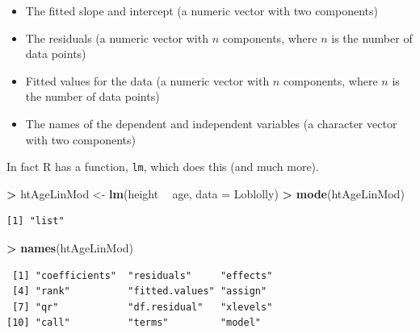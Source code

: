 \documentclass[]{krantz}
\makeatletter
\newenvironment{Shaded}{\begin{snugshade}}{\end{snugshade}}
\newcommand{\KeywordTok}[1]{\textcolor[rgb]{0.27,0.27,0.27}{\textbf{#1}}}
\newcommand{\DataTypeTok}[1]{\textcolor[rgb]{0.27,0.27,0.27}{#1}}
\newcommand{\StringTok}[1]{\textcolor[rgb]{0.5,0.5,0.5}{#1}}
\newcommand{\OperatorTok}[1]{\textcolor[rgb]{0.43,0.43,0.43}{\textbf{#1}}}
\newcommand{\NormalTok}[1]{#1}
\providecommand{\tightlist}{%
  \setlength{\itemsep}{0pt}\setlength{\parskip}{0pt}}
\newenvironment{kframe}{%
\medskip{}
\setlength{\fboxsep}{.8em}
 \def\at@end@of@kframe{}%
 \ifinner\ifhmode%
  \def\at@end@of@kframe{\end{minipage}}%
  \begin{minipage}{\columnwidth}%
 \fi\fi%
 \def\FrameCommand##1{\hskip\@totalleftmargin \hskip-\fboxsep
 \colorbox{shadecolor}{##1}\hskip-\fboxsep
     \hskip-\linewidth \hskip-\@totalleftmargin \hskip\columnwidth}%
 \MakeFramed {\advance\hsize-\width
   \@totalleftmargin\z@ \linewidth\hsize
   \@setminipage}}%
 {\par\unskip\endMakeFramed%
 \at@end@of@kframe}
\renewenvironment{Shaded}{\begin{kframe}}{\end{kframe}}
\theoremstyle{definition}
\theoremstyle{definition}
\theoremstyle{definition}
\theoremstyle{remark}
\makeatother
\begin{document}
\begin{itemize}
\tightlist
\item
  The fitted slope and intercept (a numeric vector with two components)
\item
  The residuals (a numeric vector with \(n\) components, where \(n\) is
  the number of data points)
\item
  Fitted values for the data (a numeric vector with \(n\) components,
  where \(n\) is the number of data points)
\item
  The names of the dependent and independent variables (a character
  vector with two components)
\end{itemize}

In fact R has a function, \texttt{lm}, which does this (and much more).

\begin{Shaded}
\begin{Highlighting}[]
\OperatorTok{>}\StringTok{ }\NormalTok{htAgeLinMod <-}\StringTok{ }\KeywordTok{lm}\NormalTok{(height }\OperatorTok{~}\StringTok{ }\NormalTok{age, }\DataTypeTok{data =}\NormalTok{ Loblolly)}
\OperatorTok{>}\StringTok{ }\KeywordTok{mode}\NormalTok{(htAgeLinMod)}
\end{Highlighting}
\end{Shaded}

\begin{verbatim}
[1] "list"
\end{verbatim}

\begin{Shaded}
\begin{Highlighting}[]
\OperatorTok{>}\StringTok{ }\KeywordTok{names}\NormalTok{(htAgeLinMod)}
\end{Highlighting}
\end{Shaded}

\begin{verbatim}
 [1] "coefficients"  "residuals"     "effects"      
 [4] "rank"          "fitted.values" "assign"       
 [7] "qr"            "df.residual"   "xlevels"      
[10] "call"          "terms"         "model"        
\end{verbatim}

\begin{Shaded}
\end{Shaded}
\end{document}
